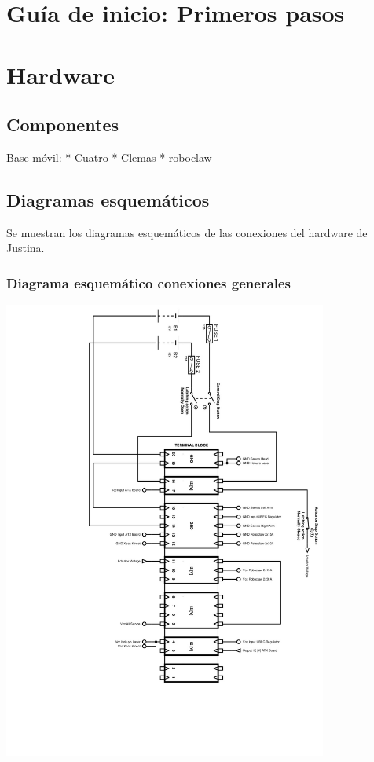 \documentclass[a4paper,usenames,dvipsnames,svgnames,table]{book}
\begin{document}
\chapter{Guía de inicio: Primeros pasos}

\chapter{Hardware}

\section{Componentes}
Base móvil: 
* Cuatro
* Clemas
* roboclaw
\section{Diagramas esquemáticos}
Se muestran los diagramas esquemáticos de las conexiones del hardware de Justina.


\subsection{Diagrama esquemático conexiones generales}

\begin{center}
\includegraphics[width=0.8\textwidth]{Figures/Hardware/Esquematicos/JustinaWiringDiagram.jpg}
\label{fig:Hardware:Partes:Diagrama:Esquematico:General}
\end{center}
\end{document}
